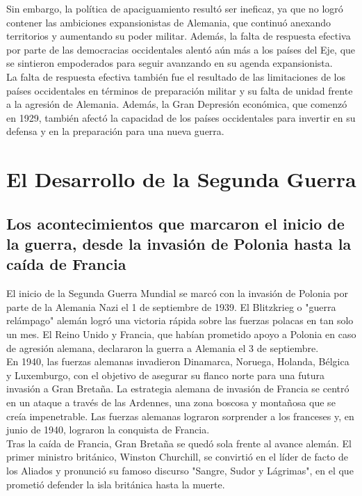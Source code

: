 \documentclass{article}
\theoremstyle{mytheoremstyle}
\theoremstyle{mytheoremstyle}
\theoremstyle{myproblemstyle}
\begin{document}
    Sin embargo, la política de apaciguamiento resultó ser ineficaz, ya que no logró contener las ambiciones expansionistas de Alemania, que continuó anexando territorios y aumentando su poder militar. Además, la falta de respuesta efectiva por parte de las democracias occidentales alentó aún más a los países del Eje, que se sintieron empoderados para seguir avanzando en su agenda expansionista.\\

    La falta de respuesta efectiva también fue el resultado de las limitaciones de los países occidentales en términos de preparación militar y su falta de unidad frente a la agresión de Alemania. Además, la Gran Depresión económica, que comenzó en 1929, también afectó la capacidad de los países occidentales para invertir en su defensa y en la preparación para una nueva guerra.\\
\newpage
\section{El Desarrollo de la Segunda Guerra}

\subsection{Los acontecimientos que marcaron el inicio de la guerra, desde la invasión de Polonia hasta la caída de Francia}

El inicio de la Segunda Guerra Mundial se marcó con la invasión de Polonia por parte de la Alemania Nazi el 1 de septiembre de 1939. El Blitzkrieg o "guerra relámpago" alemán logró una victoria rápida sobre las fuerzas polacas en tan solo un mes. El Reino Unido y Francia, que habían prometido apoyo a Polonia en caso de agresión alemana, declararon la guerra a Alemania el 3 de septiembre.\\

En 1940, las fuerzas alemanas invadieron Dinamarca, Noruega, Holanda, Bélgica y Luxemburgo, con el objetivo de asegurar su flanco norte para una futura invasión a Gran Bretaña. La estrategia alemana de invasión de Francia se centró en un ataque a través de las Ardennes, una zona boscosa y montañosa que se creía impenetrable. Las fuerzas alemanas lograron sorprender a los franceses y, en junio de 1940, lograron la conquista de Francia.\\

Tras la caída de Francia, Gran Bretaña se quedó sola frente al avance alemán. El primer ministro británico, Winston Churchill, se convirtió en el líder de facto de los Aliados y pronunció su famoso discurso "Sangre, Sudor y Lágrimas", en el que prometió defender la isla británica hasta la muerte.\\
\end{document}
